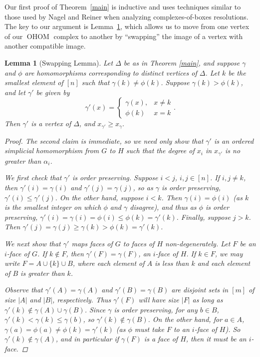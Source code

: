 \documentclass[11pt]{amsart}
\newtheorem{lemma}[theorem]{Lemma}
\theoremstyle{definition}
\numberwithin{equation}{section}
\theoremstyle{remark}
\numberwithin{equation}{section}
\begin{document}
Our first proof of Theorem~\ref{main} is inductive and uses techniques similar to those used by Nagel and Reiner \cite{NagelReiner} when analyzing complexes-of-boxes resolutions.
The key to our argument is Lemma~\ref{swap}, which allows us to move from one vertex of our $\operatorname{OHOM}$ complex to another by ``swapping'' the image of a vertex with another compatible image.

\begin{lemma}[Swapping Lemma] \label{swap} 
Let $\Delta$ be as in Theorem \ref{main}, and suppose $\gamma$ and $\phi$ are homomorphisms corresponding to distinct vertices of $\Delta$. 
Let $k$ be the smallest element of $[n]$ such that $\gamma(k) \neq \phi(k)$.
Suppose  $\gamma(k) > \phi(k)$, and let $\gamma'$ be given by
\[
\gamma'(x) = \begin{cases} \gamma(x), & x \neq k\\ \phi(k) & x=k\end{cases}.
\]
Then $\gamma'$ is a vertex of $\Delta$, and $x_{\gamma'} \geq x_{\gamma}$.

\begin{proof}
The second claim is immediate, so we need only show that $\gamma'$ is an ordered simplicial homomorphism from $G$ to $H$ such that the degree of $x_i$ in $x_{\gamma'}$ is no greater than $\alpha_i$.

We first check that $\gamma'$ is order preserving. 
Suppose $i <j$, $i,j \in [n]$. 
If $i, j \neq k$, then $\gamma'(i) = \gamma(i)$ and $\gamma'(j) = \gamma(j)$, so as $\gamma$ is order preserving, $\gamma'(i) \leq \gamma'(j)$. 
On the other hand, suppose $i < k$. 
Then $\gamma(i) = \phi(i)$ (as $k$ is the smallest integer on which $\phi$ and $\gamma$ disagree), and thus as $\phi$ is order preserving, $\gamma'(i) = \gamma(i) = \phi(i) \leq \phi(k) = \gamma'(k)$. 
Finally, suppose $j >k$. 
Then $\gamma'(j) = \gamma(j) \geq \gamma(k) > \phi(k) = \gamma'(k)$. 

We next show that $\gamma'$ maps faces of $G$ to faces of $H$ non-degenerately. 
Let $F$ be an $i$-face of $G$.  
If $k \notin F$, then $\gamma'(F) = \gamma(F)$, an $i$-face of $H$. 
If $k \in F$, we may write $F = A \cup \{k\} \cup B$, where each element of $A$ is less than $k$ and each element of $B$ is greater than $k$.

Observe that $\gamma'(A) = \gamma(A)$ and $\gamma'(B) = \gamma(B)$ are disjoint sets in $[m]$ of size $|A|$ and $|B|$, respectively. 
Thus $\gamma'(F)$ will have size $|F|$ as long as $\gamma'(k) \notin \gamma(A) \cup \gamma(B)$. 
Since $\gamma$ is order preserving, for any $b \in B$, $\gamma'(k) < \gamma(k) \leq \gamma(b)$, so $\gamma'(k) \notin \gamma(B)$. 
On the other hand, for $a \in A$, $\gamma(a) = \phi(a) \neq \phi(k) = \gamma'(k)$ (as $\phi$ must take $F$ to an $i$-face of $H$). 
So $\gamma'(k) \notin \gamma(A)$, and in particular if $\gamma(F)$ is a face of $H$, then it must be an $i$-face.


\end{proof}
\end{lemma}
\end{document}
